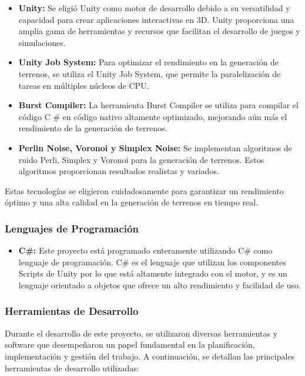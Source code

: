 \begin{itemize}
    \item \textbf{Unity:} Se eligió Unity como motor de desarrollo debido a su versatilidad y capacidad para crear aplicaciones interactivas en 3D. Unity proporciona una amplia gama de herramientas y recursos que facilitan el desarrollo de juegos y simulaciones.
    
    \item \textbf{Unity Job System:} Para optimizar el rendimiento en la generación de terrenos, se utiliza el Unity Job System, que permite la paralelización de tareas en múltiples núcleos de CPU.
    
    \item \textbf{Burst Compiler:} La herramienta Burst Compiler se utiliza para compilar el código C \# en código nativo altamente optimizado, mejorando aún más el rendimiento de la generación de terrenos.
    
    \item \textbf{Perlin Noise, Voronoi y Simplex Noise:} Se implementan algoritmos de ruido Perli, Simplex y Voronoi para la generación de terrenos. Estos algoritmos proporcionan resultados realistas y variados.
    
\end{itemize}

Estas tecnologías se eligieron cuidadosamente para garantizar un rendimiento óptimo y una alta calidad en la generación de terrenos en tiempo real.

\subsubsection{Lenguajes de Programación}
\begin{itemize}
    \item \textbf{C\#:} Este proyecto está programado enteramente utilizando C\# como lenguaje de programación. C\# es el lenguaje que utilizan los componentes Scripts de Unity por lo que está altamente integrado con el motor, y es un lenguaje orientado a objetos que ofrece un alto rendimiento y facilidad de uso.
    
\end{itemize}

\subsubsection{Herramientas de Desarrollo}

Durante el desarrollo de este proyecto, se utilizaron diversas herramientas y software que desempeñaron un papel fundamental en la planificación, implementación y gestión del trabajo. A continuación, se detallan las principales herramientas de desarrollo utilizadas:

